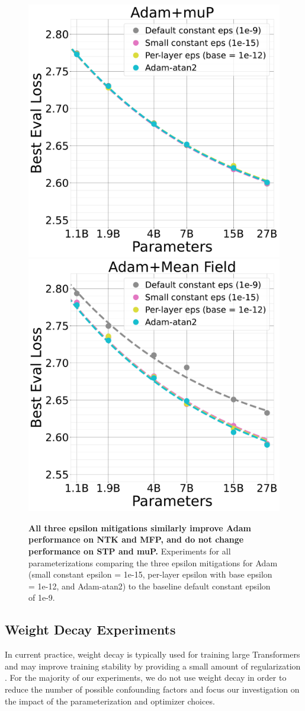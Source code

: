 \documentclass{article}
\theoremstyle{plain}
\theoremstyle{definition}
\theoremstyle{remark}
\begin{document}
\begin{figure}[ht]
\begin{center}
        \includegraphics[width=0.48\linewidth, trim={0, 0, 0, 0},clip]{icml2024/figures/epsilon/mup_epsilon_eval_loss_comparisons_zoom6.pdf}
        \hfill
        \includegraphics[width=0.48\linewidth, trim={0, 0, 0, 0},clip]{icml2024/figures/epsilon/mfp_epsilon_eval_loss_comparisons_zoom6.pdf}
       
       
        \caption{\textbf{All three epsilon mitigations similarly improve Adam performance on NTK and MFP, and do not change performance on STP and muP.} Experiments for all parameterizations comparing the three epsilon mitigations for Adam (small constant epsilon = 1e-15, per-layer epsilon with base epsilon = 1e-12, and Adam-atan2) to the baseline default constant epsilon of 1e-9.}
        \label{fig:epsilon_appendix_scaling_plots}
        \vspace{-24pt}
    \end{center}
\end{figure}
\clearpage

\subsection{Weight Decay Experiments}
\label{app:weight_decay}
In current practice, weight decay is typically used for training large Transformers and may improve training stability by providing a small amount of regularization \citep{brown2020gpt3}. For the majority of our experiments, we do not use weight decay in order to reduce the number of possible confounding factors and focus our investigation on the impact of the parameterization and optimizer choices.
\end{document}
